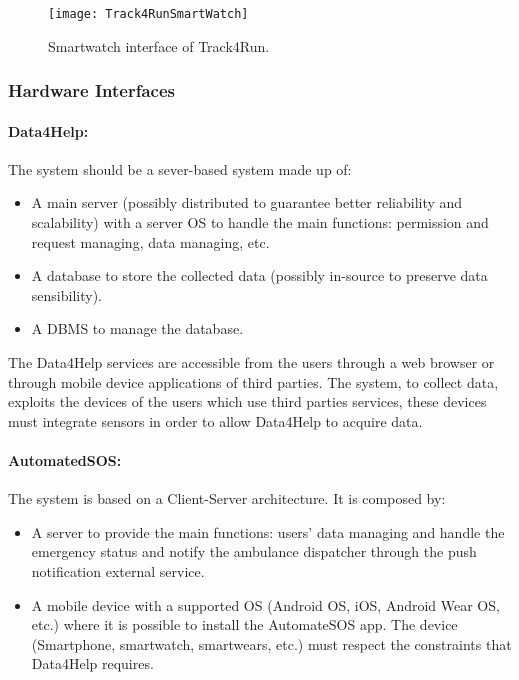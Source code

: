 \documentclass[a4paper]{article}
\begin{document}
\begin{figure}[H]
    \centering
    \texttt{[image: Track4RunSmartWatch]}
    \caption{Smartwatch interface of Track4Run.}
    \label{fig:my_label}
\end{figure}

\clearpage

\subsubsection{Hardware Interfaces}

\paragraph{Data4Help:} The system should be a sever-based system made up of:
\begin{itemize}
    \item A main server (possibly distributed to guarantee better reliability and scalability) with a server OS to handle the main functions: permission and request managing, data managing, etc.
    \item A database to store the collected data (possibly in-source to preserve data sensibility).
    \item A DBMS to manage the database.
\end{itemize}
The Data4Help services are accessible from the users through a web browser or through mobile device applications of third parties.
The system, to collect data, exploits the devices of the users which use third parties services, these devices must integrate sensors in order to allow Data4Help to acquire data.

\paragraph{AutomatedSOS:} The system is based on a Client-Server architecture. It is composed by:
\begin{itemize}
    \item A server to provide the main functions: users' data managing and handle the emergency status and notify the ambulance dispatcher through the push notification external service.
    \item A mobile device with a supported OS (Android OS, iOS, Android Wear OS, etc.) where it is possible to install the AutomateSOS app. The device (Smartphone, smartwatch, smartwears, etc.) must respect the constraints that Data4Help requires.
\end{itemize}
\end{document}

